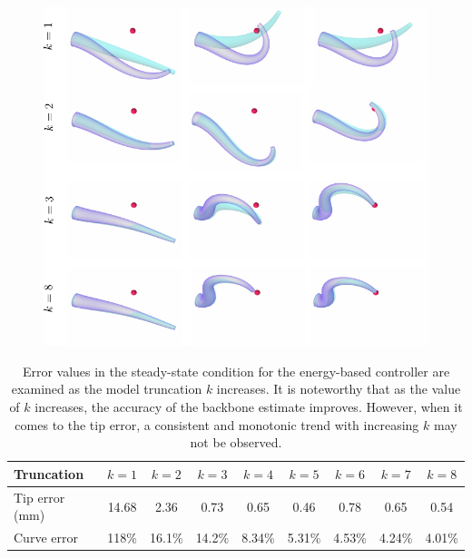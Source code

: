 %
\begin{figure}[!t]
  \centering
  \vspace{-2mm}
  \includegraphics*[width=1.04\textwidth]{./pdf/thesis-figure-5-13.pdf}
  \vspace{-5mm}
  \caption{\small {}}
  \label{fig:C3:softarm_3D_truncation}
  \vspace{-6mm}
\end{figure}

\renewcommand\arraystretch{1.15}
\begin{table}[b]
  \setlength\tabcolsep{0.44em}
  \caption{\small Error values in the steady-state condition for the energy-based controller are examined as the model truncation $k$ increases. It is noteworthy that as the value of $k$ increases, the accuracy of the backbone estimate improves. However, when it comes to the tip error, a consistent and monotonic trend with increasing $k$ may not be observed.}
  \label{tab:C3:EX3:error} \centering
  \begin{tabular}{l||cccccccc}
    \hline
    Truncation & $k=1$ & $k=2$ & $k=3$ & $k=4$ & $k=5$ & $k=6$ & $k=7$ & $k=8$ \\
    \hline 
    \hline
    Tip error (mm) & 14.68 & 2.36 & 0.73 & 0.65 & 0.46 & 0.78 & 0.65 & 0.54\\
    Curve error & 118\% & 16.1\% & 14.2\% & 8.34\% & 5.31\% & 4.53\% & 4.24\% & 4.01\% \\
    \hline
  \end{tabular}
  \end{table}
%

